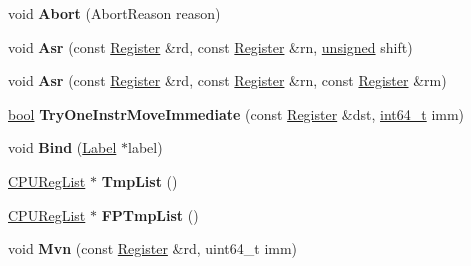 \begin{DoxyCompactItemize}
void {\bfseries Abort} (Abort\+Reason reason)
\item 
\mbox{\label{classv8_1_1internal_1_1TurboAssembler_a6eb8bd20c25e685f86af1cac0a3dc570}} 
void {\bfseries Asr} (const \mbox{\hyperlink{classv8_1_1internal_1_1Register}{Register}} \&rd, const \mbox{\hyperlink{classv8_1_1internal_1_1Register}{Register}} \&rn, \mbox{\hyperlink{classunsigned}{unsigned}} shift)
\item 
\mbox{\label{classv8_1_1internal_1_1TurboAssembler_a2e809f9f53f990ca8e235e08e8983453}} 
void {\bfseries Asr} (const \mbox{\hyperlink{classv8_1_1internal_1_1Register}{Register}} \&rd, const \mbox{\hyperlink{classv8_1_1internal_1_1Register}{Register}} \&rn, const \mbox{\hyperlink{classv8_1_1internal_1_1Register}{Register}} \&rm)
\item 
\mbox{\label{classv8_1_1internal_1_1TurboAssembler_ad58e9bb93dbf02927f4ae8acafae04ec}} 
\mbox{\hyperlink{classbool}{bool}} {\bfseries Try\+One\+Instr\+Move\+Immediate} (const \mbox{\hyperlink{classv8_1_1internal_1_1Register}{Register}} \&dst, \mbox{\hyperlink{classint64__t}{int64\+\_\+t}} imm)
\item 
\mbox{\label{classv8_1_1internal_1_1TurboAssembler_aac6ec1886d5265d229b8446f843648ff}} 
void {\bfseries Bind} (\mbox{\hyperlink{classv8_1_1internal_1_1Label}{Label}} $\ast$label)
\item 
\mbox{\label{classv8_1_1internal_1_1TurboAssembler_a477f2128cfd45ca260f012f3ba972c65}} 
\mbox{\hyperlink{classv8_1_1internal_1_1CPURegList}{C\+P\+U\+Reg\+List}} $\ast$ {\bfseries Tmp\+List} ()
\item 
\mbox{\label{classv8_1_1internal_1_1TurboAssembler_ad11ae9755837120c98ec6364fb092716}} 
\mbox{\hyperlink{classv8_1_1internal_1_1CPURegList}{C\+P\+U\+Reg\+List}} $\ast$ {\bfseries F\+P\+Tmp\+List} ()
\item 
\mbox{\label{classv8_1_1internal_1_1TurboAssembler_aaa35fe27558da62fd7b0012dd3162c78}} 
void {\bfseries Mvn} (const \mbox{\hyperlink{classv8_1_1internal_1_1Register}{Register}} \&rd, uint64\+\_\+t imm)

\end{DoxyCompactItemize}
